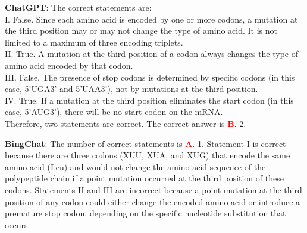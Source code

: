 \documentclass{article}
\begin{document}
{\begin{mdframed}[linewidth=1pt,linecolor=red]
		\textbf{ChatGPT}:
		The correct statements are:\\
		I. False. Since each amino acid is encoded by one or more codons, a mutation at the third position may or may not change the type of amino acid. It is not limited to a maximum of three encoding triplets.\\
		II. True. A mutation at the third position of a codon always changes the type of amino acid encoded by that codon.\\
		III. False. The presence of stop codons is determined by specific codons (in this case, 5’UGA3’ and 5’UAA3’), not by mutations at the third position.\\
		IV. True. If a mutation at the third position eliminates the start codon (in this case, 5’AUG3’), there will be no start codon on the mRNA.\\
		Therefore, two statements are correct. The correct answer is \textcolor{red}{\textbf{B}}. 2.
		
		\textbf{BingChat}: The number of correct statements is \textcolor{red}{\textbf{A}}. 1. Statement I is correct because there are three codons (XUU, XUA, and XUG) that encode the same amino acid (Leu) and would not change the amino acid sequence of the polypeptide chain if a point mutation occurred at the third position of these codons. Statements II and III are incorrect because a point mutation at the third position of any codon could either change the encoded amino acid or introduce a premature stop codon, depending on the specific nucleotide substitution that occurs.
		
	\end{mdframed}
	
}
\end{document}
